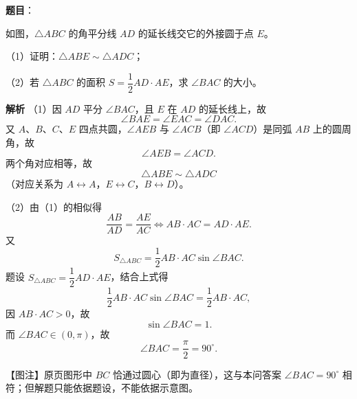 \begin{answer}

\textbf{题目}：

如图，$\triangle ABC$ 的角平分线 $AD$ 的延长线交它的外接圆于点 $E$。

（1）证明：$\triangle ABE\sim\triangle ADC$；

（2）若 $\triangle ABC$ 的面积 $S=\dfrac12AD\cdot AE$，求 $\angle BAC$ 的大小。
\nopagebreak[4]
\begin{center}\end{center}
\nopagebreak[4]
\textbf{解析}
（1）因 $AD$ 平分 $\angle BAC$，且 $E$ 在 $AD$ 的延长线上，故
\nopagebreak[4]
\[\angle BAE=\angle EAC=\angle DAC.\]
又 $A$、$B$、$C$、$E$ 四点共圆，$\angle AEB$ 与 $\angle ACB$（即 $\angle ACD$）是同弧 $AB$ 上的圆周角，故
\nopagebreak[4]
\[\angle AEB=\angle ACD.\]
两个角对应相等，故
\nopagebreak[4]
\[\triangle ABE\sim\triangle ADC\]
（对应关系为 $A\leftrightarrow A$，$E\leftrightarrow C$，$B\leftrightarrow D$）。

（2）由（1）的相似得
\nopagebreak[4]
\[\frac{AB}{AD}=\frac{AE}{AC}\iff AB\cdot AC=AD\cdot AE.\]
又
\nopagebreak[4]
\[S_{\triangle ABC}=\frac12AB\cdot AC\sin\angle BAC.\]
题设 $S_{\triangle ABC}=\dfrac12AD\cdot AE$，结合上式得
\nopagebreak[4]
\[\frac12AB\cdot AC\sin\angle BAC=\frac12AB\cdot AC,\]
因 $AB\cdot AC>0$，故
\nopagebreak[4]
\[\sin\angle BAC=1.\]
而 $\angle BAC\in(0,\pi)$，故
\nopagebreak[4]
\[\angle BAC=\frac{\pi}{2}=90^\circ.\]

【图注】原页图形中 $BC$ 恰通过圆心（即为直径），这与本问答案 $\angle BAC=90^\circ$ 相符；但解题只能依据题设，不能依据示意图。


\end{answer}
